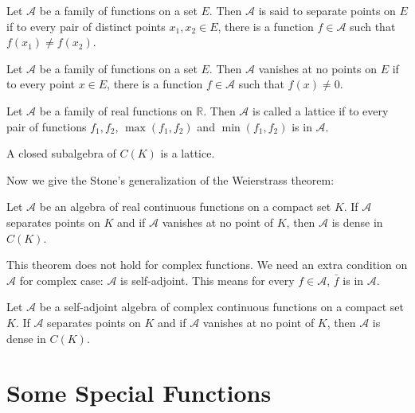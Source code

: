 \begin{definition}
    Let $\mathscr{A}$ be a family of functions on a set $E$. Then $\mathscr{A}$ is said to separate points on $E$ if to every pair of distinct points $x_1,x_2\in E$, there is a function $f\in\mathscr{A}$ such that $f(x_1)\neq f(x_2)$.
\end{definition}
\begin{definition}
    Let $\mathscr{A}$ be a family of functions on a set $E$. Then $\mathscr{A}$ vanishes at no points on $E$ if to every point $x\in E$, there is a function $f\in\mathscr{A}$ such that $f(x)\neq 0$.
\end{definition}
\begin{definition}[lattice]
    Let $\mathscr{A}$ be a family of real functions on $\mathbb{R}$. Then $\mathscr{A}$ is called a lattice if to every pair of functions $f_1,f_2$, $\max(f_1,f_2)$ and $\min(f_1,f_2)$ is in $\mathscr{A}$.
\end{definition}
\begin{remark}
    A closed subalgebra of $C(K)$ is a lattice.
\end{remark}
Now we give the Stone's generalization of the Weierstrass theorem:
\begin{theorem}
    Let $\mathscr{A}$ be an algebra of real continuous functions on a compact set $K$. If $\mathscr{A}$ separates points on $K$ and if $\mathscr{A}$ vanishes at no point of $K$, then $\mathscr{A}$ is dense in $C(K)$.
\end{theorem}
This theorem does not hold for complex functions. We need an extra condition on $\mathscr{A}$ for complex case: $\mathscr{A}$ is self-adjoint. This means for every $f\in\mathscr{A}$, $\bar{f}$ is in $\mathscr{A}$.
\begin{theorem}
    Let $\mathscr{A}$ be a self-adjoint algebra of complex continuous functions on a compact set $K$. If $\mathscr{A}$ separates points on $K$ and if $\mathscr{A}$ vanishes at no point of $K$, then $\mathscr{A}$ is dense in $C(K)$.
\end{theorem}
\chapter{Some Special Functions}
